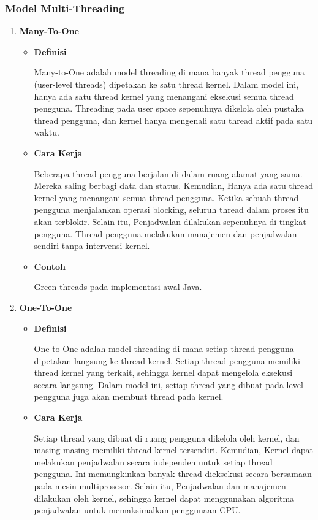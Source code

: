 \documentclass[12pt]{article}
\begin{document}
\begin{itemize}
\subsubsection{Model Multi-Threading}
\begin{enumerate}
    \item\textbf{Many-To-One}
    \begin{itemize}
        \item\textbf{Definisi} 
        \par \hspace{2em} Many-to-One adalah model threading di mana banyak thread pengguna (user-level threads) dipetakan ke satu thread kernel. Dalam model ini, hanya ada satu thread kernel yang menangani eksekusi semua thread pengguna. Threading pada user space sepenuhnya dikelola oleh pustaka thread pengguna, dan kernel hanya mengenali satu thread aktif pada satu waktu.
        \item\textbf{Cara Kerja}
        \par \hspace{2em} Beberapa thread pengguna berjalan di dalam ruang alamat yang sama. Mereka saling berbagi data dan status. Kemudian, Hanya ada satu thread kernel yang menangani semua thread pengguna. Ketika sebuah thread pengguna menjalankan operasi blocking, seluruh thread dalam proses itu akan terblokir. Selain itu, Penjadwalan dilakukan sepenuhnya di tingkat pengguna. Thread pengguna melakukan manajemen dan penjadwalan sendiri tanpa intervensi kernel.
        \item\textbf{Contoh}
        \par \hspace{2em} Green threads pada implementasi awal Java.
    \end{itemize}
    \item\textbf{One-To-One} 
        \begin{itemize}
        \item\textbf{Definisi}
        \par \hspace{2em} One-to-One adalah model threading di mana setiap thread pengguna dipetakan langsung ke thread kernel. Setiap thread pengguna memiliki thread kernel yang terkait, sehingga kernel dapat mengelola eksekusi secara langsung. Dalam model ini, setiap thread yang dibuat pada level pengguna juga akan membuat thread pada kernel.
        \item\textbf{Cara Kerja}
        \par \hspace{2em} Setiap thread yang dibuat di ruang pengguna dikelola oleh kernel, dan masing-masing memiliki thread kernel tersendiri. Kemudian, Kernel dapat melakukan penjadwalan secara independen untuk setiap thread pengguna. Ini memungkinkan banyak thread dieksekusi secara bersamaan pada mesin multiprosesor. Selain itu, Penjadwalan dan manajemen dilakukan oleh kernel, sehingga kernel dapat menggunakan algoritma penjadwalan untuk memaksimalkan penggunaan CPU.

\end{itemize}
\end{enumerate}
\end{itemize}
\end{document}
